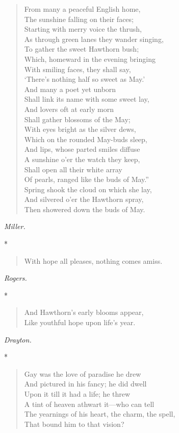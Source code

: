 \documentclass[11pt,twoside]{article}
\newcommand\stars{\begin{center}*\quad*\quad*\end{center}}
\newcommand\by[1]{\par\hfill\textit{#1}\par}
\begin{document}
\begin{verse}
From many a peaceful English home,\\
\quad The sunshine falling on their faces;\\
Starting with merry voice the thrush,\\
\quad As through green lanes they wander singing,\\
To gather the sweet Hawthorn bush;\\
\quad Which, homeward in the evening bringing\\
With smiling faces, they shall say,\\
‘There’s nothing half so sweet as May.’\\
And many a poet yet unborn\\
\quad Shall link its name with some sweet lay,\\
And lovers oft at early morn\\
\quad Shall gather blossoms of the May;\\
With eyes bright as the silver dews,\\
\quad Which on the rounded May-buds sleep,\\
And lips, whose parted smiles diffuse\\
\quad A sunshine o’er the watch they keep,\\
Shall open all their white array\\
Of pearls, ranged like the buds of May.”\\
Spring shook the cloud on which she lay,\\
And silvered o’er the Hawthorn spray,\\
Then showered down the buds of May.
\end{verse}

\by{Miller.}

\stars

\begin{verse}
With hope all pleases, nothing comes amiss.
\end{verse}

\by{Rogers.}

\stars

\begin{verse}
And Hawthorn’s early blooms appear,\\
Like youthful hope upon life’s year.
\end{verse}

\by{Drayton.}

\stars

\begin{verse}
Gay was the love of paradise he drew\\
And pictured in his fancy; he did dwell\\
Upon it till it had a life; he threw\\
A tint of heaven athwart it---who can tell\\
The yearnings of his heart, the charm, the spell,\\
That bound him to that vision?
\end{verse}
\end{document}
